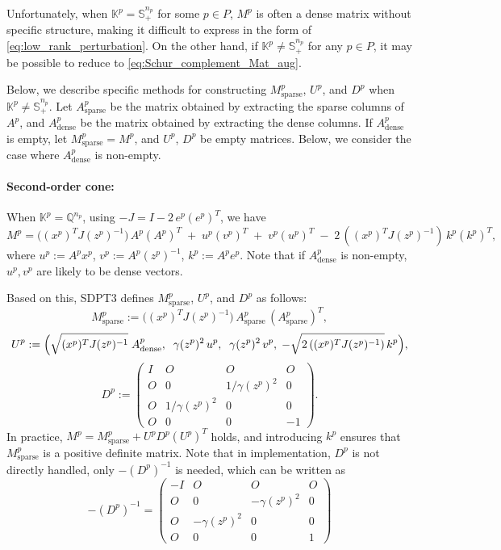 \medskip

Unfortunately, when $\mathbb{K}^p = \mathbb{S}^{n_p}_+$ for some $p \in P$, $M^p$ is often a dense matrix without specific structure, making it difficult to express in the form of \eqref{eq:low_rank_perturbation}.
On the other hand, if $\mathbb{K}^p \neq \mathbb{S}^{n_p}_+$ for any $p\in P$, it may be possible to reduce to \eqref{eq:Schur_complement_Mat_aug}.

\medskip

Below, we describe specific methods for constructing $M^p_{\mathrm{sparse}}$, $U^p$, and $D^p$ when $\mathbb{K}^p \neq \mathbb{S}^{n_p}_+$.
Let $A^p_{\mathrm{sparse}}$ be the matrix obtained by extracting the sparse columns of $A^p$, and $A^p_{\mathrm{dense}}$ be the matrix obtained by extracting the dense columns.
If $A^p_{\mathrm{dense}}$ is empty, let $M^p_{\mathrm{sparse}} = M^p$, and $U^p$, $D^p$ be empty matrices.
Below, we consider the case where $A^p_{\mathrm{dense}}$ is non-empty.

\paragraph{Second-order cone:}

When $\mathbb{K}^p=\mathbb{Q}^{n_p}$, using $-J = I - 2\,e^p(e^p)^T$, we have
\[
  M^p 
  = \bigl((x^p)^T J (z^p)^{-1}\bigr)\, A^p(A^p)^T
    \;+\; u^p (v^p)^T
    \;+\; v^p (u^p)^T
    \;-\; 2\,((x^p)^T J (z^p)^{-1})\, k^p (k^p)^T,
\]
where $u^p := A^p x^p$, $v^p := A^p (z^p)^{-1}$, $k^p := A^p e^p$.
Note that if $A^p_{\mathrm{dense}}$ is non-empty, $u^p, v^p$ are likely to be dense vectors.

Based on this, SDPT3 defines $M^p_{\mathrm{sparse}}$, $U^p$, and $D^p$ as follows:
\[
  M^p_{\mathrm{sparse}}
    := \bigl((x^p)^T J (z^p)^{-1}\bigr)\,
       A^p_{\mathrm{sparse}}\,(A^p_{\mathrm{sparse}})^T,
\]
\[
  U^p
    := \Bigl(\sqrt{(x^p)^T J (z^p)^{-1}}\;A^p_{\mathrm{dense}},
       \;\;\gamma(z^p)^2\,u^p,\;\;\gamma(z^p)^2\,v^p,
       \;-\sqrt{2\,((x^p)^T J (z^p)^{-1})}\,k^p\Bigr),
\]
\[
  D^p
    := \begin{pmatrix}
         I & O & O & O \\
         O & 0 & 1/\gamma(z^p)^2 & 0 \\
         O & 1/\gamma(z^p)^2 & 0 & 0 \\
         O & 0 & 0 & -1
       \end{pmatrix}.
\]
In practice, $M^p = M^p_{\mathrm{sparse}} + U^p D^p (U^p)^T$ holds, and introducing $k^p$ ensures that $M^p_{\mathrm{sparse}}$ is a positive definite matrix.
Note that in implementation, $D^p$ is not directly handled, only $-(D^p)^{-1}$ is needed, which can be written as
\[
  -(D^p)^{-1}
  = \begin{pmatrix}
      -I & O & O & O \\
      O & 0 & -\gamma(z^p)^2 & 0 \\
      O & -\gamma(z^p)^2 & 0 & 0 \\
      O & 0 & 0 & 1
    \end{pmatrix}
\]

